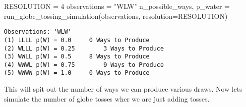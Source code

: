 \documentclass[
  letterpaper,
  DIV=11,
  numbers=noendperiod]{scrreprt}
\newenvironment{Shaded}{\begin{snugshade}}{\end{snugshade}}
\newcommand{\DecValTok}[1]{\textcolor[rgb]{0.68,0.00,0.00}{#1}}
\newcommand{\NormalTok}[1]{\textcolor[rgb]{0.00,0.23,0.31}{#1}}
\newcommand{\OperatorTok}[1]{\textcolor[rgb]{0.37,0.37,0.37}{#1}}
\newcommand{\StringTok}[1]{\textcolor[rgb]{0.13,0.47,0.30}{#1}}
\begin{document}
\begin{Shaded}
\begin{Highlighting}[]
\NormalTok{RESOLUTION }\OperatorTok{=} \DecValTok{4}
\NormalTok{observations }\OperatorTok{=} \StringTok{"WLW"}
\NormalTok{n\_possible\_ways, p\_water }\OperatorTok{=}\NormalTok{ run\_globe\_tossing\_simulation(observations, resolution}\OperatorTok{=}\NormalTok{RESOLUTION)}
\end{Highlighting}
\end{Shaded}

\begin{verbatim}
Observations: 'WLW'
(1) LLLL p(W) = 0.0     0 Ways to Produce
(2) WLLL p(W) = 0.25        3 Ways to Produce
(3) WWLL p(W) = 0.5     8 Ways to Produce
(4) WWWL p(W) = 0.75        9 Ways to Produce
(5) WWWW p(W) = 1.0     0 Ways to Produce
\end{verbatim}

This will spit out the number of ways we can produce various draws. Now
lets simulate the number of globe tosses wher we are just adding tosses.
\end{document}
